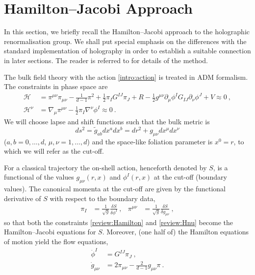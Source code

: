 \documentclass[a4paper,12pt]{article}
\begin{document}
\section{Hamilton--Jacobi Approach}
\label{review}
In this section, we briefly recall the Hamilton--Jacobi  
approach to the holographic renormalisation group. We shall put
special emphasis on the differences with the standard implementation
of holography in order to establish a suitable connection in later
sections. The reader is referred to
\cite{deBoer00a,Verlinde00a,Verlinde00b,Fukuma00a,Fukuma00b} for 
details of the method. 

The bulk field theory with the action \eqref{intro:action} is treated
in ADM formalism. The constraints in phase space are 
\begin{align}
\label{review:Hamilton}
  \mathcal{H} &= \pi^{\mu\nu} \pi_{\mu\nu} - \frac1{d-1} \pi^2 +\frac12
  \pi_I G^{IJ} \pi_J +R - \frac12 g^{\mu\nu} \partial_\mu \phi^I
  G_{IJ} \partial_\nu \phi^J + V \approx 0~, \\
\label{review:Hnu}
  \mathcal{H}^\nu &= \nabla_\mu \pi^{\mu\nu} -\frac12 \pi_I \nabla^\nu
  \phi^I \approx 0~.
\end{align}
We will choose lapse and shift functions such that the bulk metric is 
\begin{equation}
\label{review:metric}
  ds^2 = \tilde g_{ab} dx^a dx^b = dr^2 +g_{\mu\nu} dx^\mu dx^\nu
\end{equation}
($a,b= 0,\ldots,d$, $\mu,\nu=1,\ldots,d$) and the space-like foliation 
parameter is $x^0=r$, to which we will refer as the cut-off.
 
For a classical trajectory the on-shell action, henceforth denoted by
$S$, is a functional of the values $g_{\mu\nu}(r,x)$ and $\phi^I(r,x)$
at the cut-off (boundary values).
The canonical momenta at the cut-off are given by the 
functional derivative of $S$ with respect to the boundary data,
\begin{align}
\label{review:momenta}
  \pi_I &= \frac1{\sqrt{g}} \frac{\delta S}{\delta \phi^I}~, & 
  \pi^{\mu\nu} &= \frac1{\sqrt{g}} \frac{\delta S}{\delta g_{\mu\nu}}~,
\end{align}
so that both the constraints \eqref{review:Hamilton} and \eqref{review:Hnu}
become the Hamilton--Jacobi equations for $S$.
Moreover, (one half of) the Hamilton equations of motion yield the flow
equations, 
\begin{align}
\label{review:HJ1}
  \dot{\phi}^I &= G^{IJ} \pi_J~,\\
\label{review:HJ2}
  \dot{g}_{\mu\nu} &= 2\pi_{\mu\nu} -\frac2{d-1} g_{\mu\nu} \pi~.
\end{align}
\end{document}
